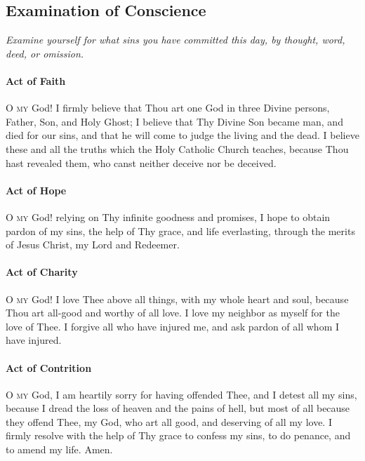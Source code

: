 \documentclass[9pt]{article}
\begin{document}
\begin{multicols}{3}
\subsection*{Examination of Conscience}

\textit{Examine yourself for what sins you have committed this day, by thought,
word, deed, or omission.}

\paragraph{Act of Faith}

\textsc{O my} God! I firmly believe that Thou art one God in three Divine persons,
Father, Son, and Holy Ghost; I believe that Thy Divine Son became man,
and died for our sins, and that he will come to judge the living and the
dead. I believe these and all the truths which the Holy Catholic Church
teaches, because Thou hast revealed them, who canst neither deceive nor
be deceived.

\paragraph{Act of Hope}

\textsc{O my} God! relying on Thy infinite goodness and promises, I hope to obtain
pardon of my sins, the help of Thy grace, and life everlasting, through
the merits of Jesus Christ, my Lord and Redeemer. 

\paragraph{Act of Charity}

\textsc{O my} God! I love Thee above all things, with my whole heart and soul,
because Thou art all-good and worthy of all love. I love my neighbor as
myself for the love of Thee. I forgive all who have injured me, and ask
pardon of all whom I have injured. 

\paragraph{Act of Contrition}

\textsc{O my} God, I am heartily sorry for having offended Thee, and I detest
all my sins, because I dread the loss of heaven and the pains of hell, but most
of all because they offend Thee, my God, who art all good, and deserving of all
my love. I firmly resolve with the help of Thy grace to confess my sins, to do
penance, and to amend my life. Amen. 


\end{multicols}
\end{document}
